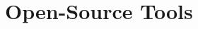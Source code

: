 \documentclass[conference]{IEEEtran}
\begin{document}
%
%



\section{Open-Source Tools}
\label{sec:tools}
\end{document}
